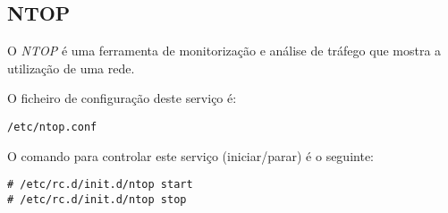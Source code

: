 \subsection{NTOP}

O \emph{NTOP} é uma ferramenta de monitorização e análise de tráfego que mostra a utilização de uma rede.

O ficheiro de configuração deste serviço é:

\begin{Verbatim}[commandchars=\\\{\}]
/etc/ntop.conf
\end{Verbatim}

O comando para controlar este serviço (iniciar/parar) é o seguinte:

\begin{Verbatim}[commandchars=\\\{\}]
# /etc/rc.d/init.d/ntop start
# /etc/rc.d/init.d/ntop stop
\end{Verbatim}

